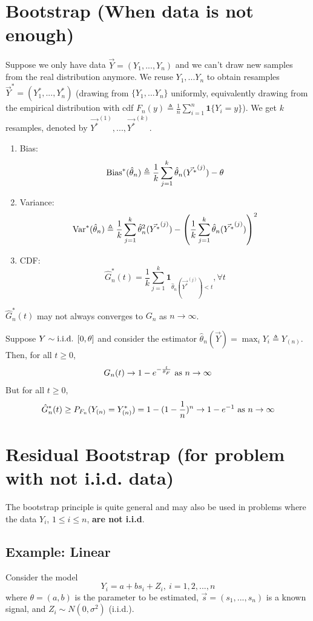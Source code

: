 \documentclass[11pt]{elegantbook}
\begin{document}
\section{Bootstrap (When data is not enough)}
Suppose we only have data $\vec{Y}=(Y_1,...,Y_n)$ and we can't draw new samples from the real distribution anymore. We reuse $Y_1,...Y_n$ to obtain resamples $\vec{Y}^*=(Y_1^*,...,Y_n^*)$ (drawing from $\{Y_1,...Y_n\}$ uniformly, equivalently drawing from the empirical distribution with cdf $F_n(y)\triangleq \frac{1}{n}\sum_{i=1}^n\mathbf{1}\{Y_i=y\}$). We get $k$ resamples, denoted by ${\vec{Y^*}}^{(1)},...,{\vec{Y^*}}^{(k)}$.
\begin{enumerate}
    \item Bias: $$\textnormal{Bias}^*(\hat{\theta}_n)\triangleq\frac{1}{k}\sum_{j=1}^k \hat{\theta}_n(\vec{Y^*}^{(j)})-\theta$$
    \item Variance: $$\textnormal{Var}^*(\hat{\theta}_n)\triangleq\frac{1}{k}\sum_{j=1}^k \hat{\theta}^2_n(\vec{Y^*}^{(j)})-\left(\frac{1}{k}\sum_{j=1}^k \hat{\theta}_n(\vec{Y^*}^{(j)})\right)^2$$
    \item CDF: $$\hat{G}^*_{n}(t)=\frac{1}{k}\sum_{j=1}^k \mathbf{1}_{\hat{\theta}_n(\vec{Y^*}^{(j)})<t},\forall t$$
\end{enumerate}
\begin{note}
    $\hat{G}^*_{n}(t)$ may not always converges to $G_n$ as $n \rightarrow \infty$.
\end{note}
\begin{example}
    Suppose $Y\sim \textnormal{i.i.d. }[0,\theta]$ and consider the estimator $\hat{\theta}_n(\vec{Y})=\max_i Y_i\triangleq Y_{(n)}$. Then, for all $t\geq 0$, $$G_n(t) \rightarrow 1-e^{-\frac{t}{\theta_F}}\textnormal{ as }n \rightarrow \infty$$
    But for all $t\geq 0$, $$\hat{G}^*_{n}(t)\geq P_{F_n}(Y_{(n)}=Y^*_{(n)})=1-(1-\frac{1}{n})^n \rightarrow  1-e^{-1} \textnormal{ as }n \rightarrow \infty$$
\end{example}


\section{Residual Bootstrap (for problem with not i.i.d. data)}
The bootstrap principle is quite general and may also be used in problems where the data $Y_i$, $1\leq i\leq n$, \textbf{are not i.i.d}.

\subsection{Example: Linear}
Consider the model $$Y_i=a+bs_i+Z_i,\ i=1,2,...,n$$
where $\theta=(a,b)$ is the parameter to be estimated, $\vec{s}=(s_1,...,s_n)$ is a known signal, and $Z_i\sim N(0,\sigma^2)$ (i.i.d.).
\end{document}
